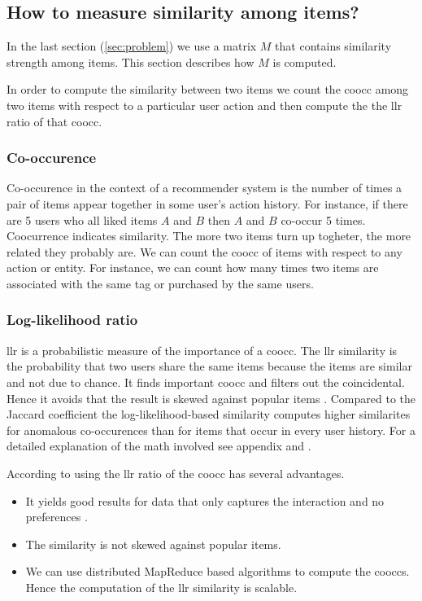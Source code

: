\subsection{How to measure similarity among items?}
\label{sec:llr}

In the last section (\ref{sec:problem}) we use a matrix $M$ that contains similarity strength among items. This section describes how $M$ is computed.

In order to compute the similarity between two items we count the \gls{coocc} among two items with respect to a particular user action and then compute the the \gls{llr} ratio of that \gls{coocc}.

\subsubsection{Co-occurence}
\label{sec:cooccurence}

Co-occurence in the context of a recommender system is the number of times a pair of items appear together in some user's action history. For instance, if there are 5 users who all liked items $A$ and $B$ then $A$ and $B$ co-occur 5 times. Coocurrence indicates similarity. The more two items turn up togheter, the more related they probably are. We can count the \gls{coocc} of items with respect to any action or entity. For instance, we can count how many times two items are associated with the same tag or purchased by the same users.

\subsubsection{Log-likelihood ratio}
\label{sec:llrs}

\gls{llr} is a probabilistic measure of the importance of a \gls{coocc}. The \gls{llr} similarity  is the probability that two users share the same items because the items are similar and not due to chance. It finds important \gls{coocc} and filters out the coincidental. Hence it avoids that the result is skewed against popular items \cite{Dunning93}. Compared to the Jaccard coefficient \cite{Hartung} the log-likelihood-based similarity computes higher similarites for anomalous co-occurences than for items that occur in every user history. For a detailed explanation of the math involved see appendix and \cite{Dunning93}. 

According to \cite{Dunning14} using the \gls{llr} ratio of the \gls{coocc} has several advantages.
\begin{itemize}
\item It yields good results for data that only captures the interaction and no \glspl{preference} \cite{Dunning93}.
\item The similarity is not skewed against popular items.
\item We can use distributed MapReduce based algorithms to compute the \glspl{coocc}. Hence the computation of the \gls{llr} similarity is \gls{scalable}.
\end{itemize}

